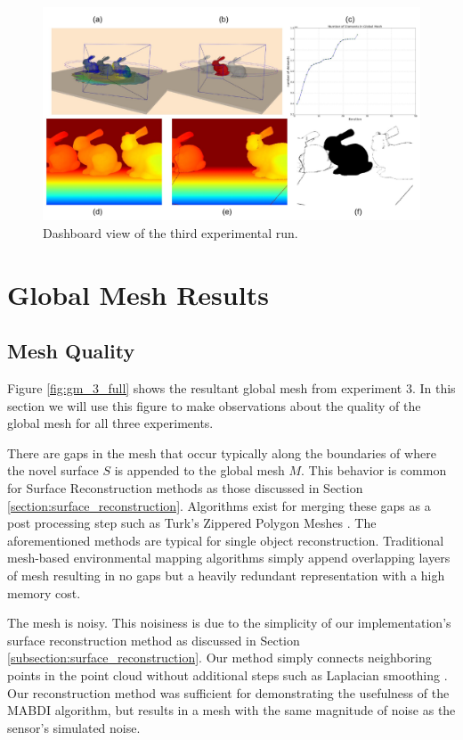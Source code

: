 \begin{figure}[h]%
\centering
  \includegraphics[width=\textwidth]{figures/results_run3.pdf}
  \caption{Dashboard view of the third experimental run.}
  \label{fig:run3}
\end{figure}

\section{Global Mesh Results}
\label{section:results2}

\subsection{Mesh Quality}

Figure \ref{fig:gm_3_full} shows the resultant global mesh from experiment 3. In
this section we will use this figure to make observations about the quality of
the global mesh for all three experiments.

There are gaps in the mesh that occur typically along the boundaries
of where the novel surface $S$ is appended to the global mesh $M$. This behavior
is common for Surface Reconstruction methods as those discussed in Section
\ref{section:surface_reconstruction}. Algorithms exist for merging these gaps as
a post processing step such as Turk's Zippered Polygon Meshes \cite{Turk1994}.
The aforementioned methods are typical for single object reconstruction.
Traditional mesh-based environmental mapping algorithms simply append
overlapping layers of mesh resulting in no gaps but a heavily redundant
representation with a high memory cost.

The mesh is noisy. This noisiness is due to the simplicity of our
implementation's surface reconstruction method as discussed in Section
\ref{subsection:surface_reconstruction}. Our method simply connects neighboring
points in the point cloud without additional steps such as Laplacian smoothing
\cite{Nealen2006}. Our reconstruction method was sufficient for
demonstrating the usefulness of the MABDI algorithm, but results in a mesh with
the same magnitude of noise as the sensor's simulated noise.

